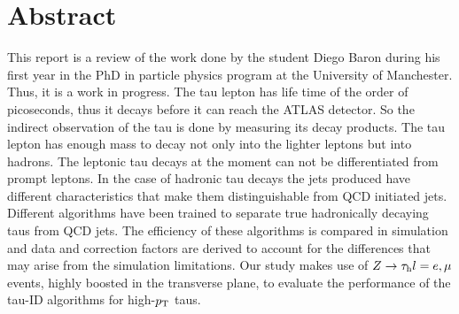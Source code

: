 \chapter*{Abstract}
This report is a review of the work done by the student Diego Baron during his first year in the PhD in particle physics program at the University of Manchester. Thus, it is a work in progress. The tau lepton has life time of the order of picoseconds, thus it decays before it can reach the ATLAS detector. So the indirect observation of the tau is done by measuring its decay products. The tau lepton has enough mass to decay not only into the lighter leptons but into hadrons. The leptonic tau decays at the moment can not be differentiated from prompt leptons. In the case of hadronic tau decays the jets produced have different characteristics that make them distinguishable from QCD initiated jets. Different algorithms have been trained to separate true hadronically decaying taus from QCD jets. The efficiency of these algorithms is compared in simulation and data and correction factors are derived to account for the differences that may arise from the simulation limitations. Our study makes use of $Z\to\tau_\text{h} l=e,\mu$ events, highly boosted in the transverse plane, to evaluate the performance of the tau-ID algorithms for high-$p_\text{T}$ taus.



